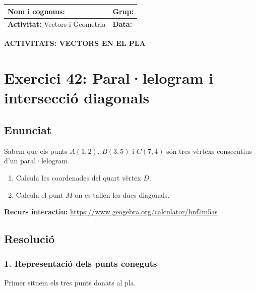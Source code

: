 \documentclass[12pt,a4paper]{article}
\begin{document}
\begingroup
\renewcommand{\arraystretch}{2.2}
\begin{tabularx}{\textwidth}{|X|p{4cm}|}
    \hline
    \textbf{Nom i cognoms:} & \textbf{Grup:} \\ \hline
    \textbf{Activitat:} Vectors i Geometria & \textbf{Data:} \\ \hline
\end{tabularx}
\endgroup

\vspace{0.8cm}

\begin{center}
    {\Large \textbf{ACTIVITATS: VECTORS EN EL PLA}}
\end{center}

\vspace{0.5cm}


\section{Exercici 42: Paral·lelogram i intersecció diagonals}

\subsection*{Enunciat}
Sabem que els punts $A(1, 2)$, $B(3, 5)$ i $C(7, 4)$ són tres vèrtexs consecutius d'un paral·lelogram. 
\begin{enumerate}
    \item Calcula les coordenades del quart vèrtex $D$.
    \item Calcula el punt $M$ on es tallen les dues diagonals.
\end{enumerate}

\vspace{0.3cm}
\noindent \textbf{Recurs interactiu:} \url{https://www.geogebra.org/calculator/hnf7m5as}

\subsection*{Resolució}

\subsubsection*{1. Representació dels punts coneguts}
Primer situem els tres punts donats al pla.
\end{document}
